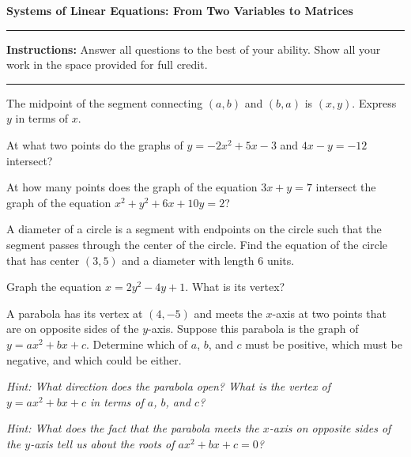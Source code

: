\documentclass[12pt]{exam}
\newcommand{\examtitle}{Systems of Linear Equations: From Two Variables to Matrices}
\newcommand{\instructions}{
    \noindent\rule{\textwidth}{0.5pt}
    \begin{center}
    \textbf{Instructions:} Answer all questions to the best of your ability. Show all your work in the space provided for full credit.
    \end{center}
    \noindent\rule{\textwidth}{0.5pt}
}
\begin{document}
\begin{center}
\textbf{\Large \examtitle} \\
\vspace{0.5cm}
\hspace{0.1\textwidth}
\end{center}

\instructions
\vspace{0.5cm}

\begin{questions}

\pointsinrightmargin

\question[8]
The midpoint of the segment connecting $(a, b)$ and $(b, a)$ is $(x, y)$. Express $y$ in terms of $x$.
\vspace*{4cm}

\question[10]
At what two points do the graphs of $y = -2x^2 + 5x - 3$ and $4x - y = -12$ intersect?
\vspace*{4cm}

\question[8]
At how many points does the graph of the equation $3x + y = 7$ intersect the graph of the equation $x^2 + y^2 + 6x + 10y = 2$?
\vspace*{4cm}

\newpage

\question[10]
A diameter of a circle is a segment with endpoints on the circle such that the segment passes through the center of the circle. Find the equation of the circle that has center $(3, 5)$ and a diameter with length 6 units.
\vspace*{5cm}

\question[12]
Graph the equation $x = 2y^2 - 4y + 1$. What is its vertex?
\vspace*{5cm}

\newpage

\question[10]
A parabola has its vertex at $(4, -5)$ and meets the $x$-axis at two points that are on opposite sides of the $y$-axis. Suppose this parabola is the graph of $y = ax^2 + bx + c$. Determine which of $a$, $b$, and $c$ must be positive, which must be negative, and which could be either.

\textit{Hint: What direction does the parabola open? What is the vertex of $y = ax^2 + bx + c$ in terms of $a$, $b$, and $c$?}

\textit{Hint: What does the fact that the parabola meets the $x$-axis on opposite sides of the $y$-axis tell us about the roots of $ax^2 + bx + c = 0$?}
\vspace*{5cm}


\end{questions}
\end{document}
